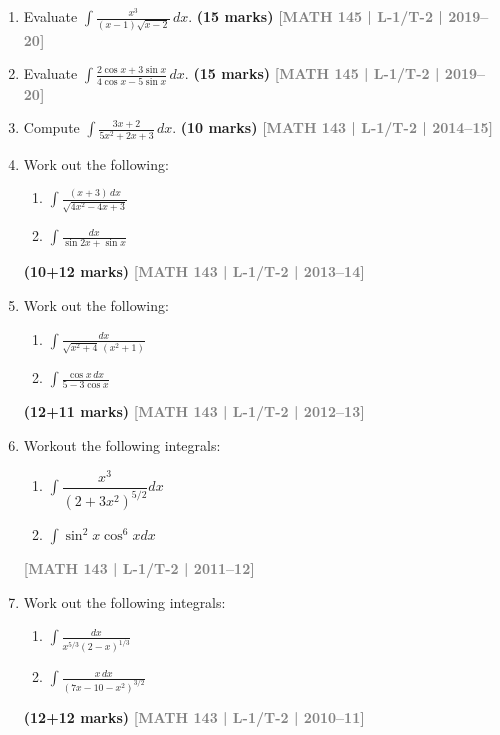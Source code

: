 \documentclass[12pt,a3paper]{article}
\newcommand{\yr}[1]{\hfill\textcolor{gray}{\small\textbf{[#1]}}}
\newcommand{\mk}[1]{\textcolor{orange!70!black}{\small\textbf{(#1 marks)}}}
\begin{document}
\begin{enumerate}

\item Evaluate $\displaystyle\int\frac{x^{3}}{(x-1)\sqrt{x-2}}\,dx$.
\mk{15} \yr{MATH 145 | L-1/T-2 | 2019--20}

\item Evaluate $\displaystyle\int\frac{2\cos x+3\sin x}{4\cos x-5\sin x}\,dx$.
\mk{15} \yr{MATH 145 | L-1/T-2 | 2019--20}

\item Compute $\displaystyle\int \frac{3x+2}{{5x^{2}+2x+3}}\,dx$.
\mk{10} \yr{MATH 143 | L-1/T-2 | 2014--15}

\item Work out the following:
\begin{enumerate}
  \item $\displaystyle\int \frac{(x+3)\,dx}{\sqrt{4x^{2}-4x+3}}$
  \item $\displaystyle\int \frac{dx}{\sin 2x + \sin x}$
\end{enumerate}
\mk{10+12} \yr{MATH 143 | L-1/T-2 | 2013--14}

\item Work out the following:
\begin{enumerate}
  \item $\displaystyle\int \frac{dx}{\sqrt{x^{2}+4}\,(x^{2}+1)}$
  \item $\displaystyle\int \frac{\cos x\,dx}{5-3\cos x}$
\end{enumerate}
\mk{12+11} \yr{MATH 143 | L-1/T-2 | 2012--13}

\item Workout the following integrals: 
\begin{enumerate}
    \item $\displaystyle\int\dfrac{x^3}{(2+3x^2)^{5/2}}dx$
    \item $\displaystyle\int\sin^2 x\cos^6 xdx$
\end{enumerate}
\yr{MATH 143 | L-1/T-2 | 2011--12}

\item Work out the following integrals:
\begin{enumerate}
  \item $\displaystyle\int \frac{dx}{x^{5/3}(2-x)^{1/3}}$
  \item $\displaystyle\int \frac{x \, dx}{(7x - 10 - x^2)^{3/2}}$
\end{enumerate}
\mk{12+12} \yr{MATH 143 | L-1/T-2 | 2010--11}

\end{enumerate}
\end{document}
